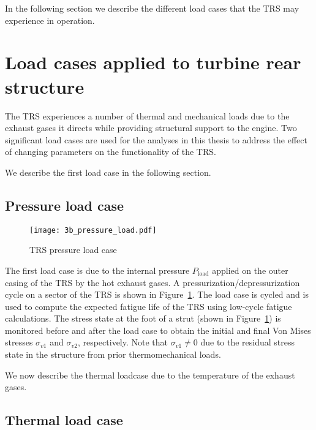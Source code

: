 In the following section we describe the different load cases that the \ac{TRS} may experience in operation.

\section{Load cases applied to turbine rear structure}
\label{sec:loadcases}

The \ac{TRS} experiences a number of thermal and mechanical loads due to the exhaust gases it directs while providing structural support to the engine. Two significant load cases are used for the analyses in this thesis to address the effect of changing parameters on the functionality of the \ac{TRS}.

We describe the first load case in the following section.

\subsection{Pressure load case} \label{subsec:iploadcase}

\begin{figure}[h!]
    \centering
    \texttt{[image: 3b\_pressure\_load.pdf]}
    \caption{ \label{fig:ipload} \ac{TRS} pressure load case }
\end{figure}

The first load case is due to the internal pressure $P_{\textrm{load}}$ applied on the outer casing of the \ac{TRS} by the hot exhaust gases. A pressurization/depressurization cycle on a sector of the \ac{TRS} is shown in Figure~\ref{fig:ipload}. The load case is cycled and is used to compute the expected fatigue life of the \ac{TRS} using low-cycle fatigue calculations. The stress state at the foot of a strut (shown in Figure~\ref{fig:ipload}) is monitored before and after the load case to obtain the initial and final Von Mises stresses $\sigma_{v1}$ and $\sigma_{v2}$, respectively. Note that $\sigma_{v1} \neq 0$ due to the residual stress state in the structure from prior thermomechanical loads. 

We now describe the thermal loadcase due to the temperature of the exhaust gases.

\subsection{Thermal load case} \label{subsec:thermalloadcase}

